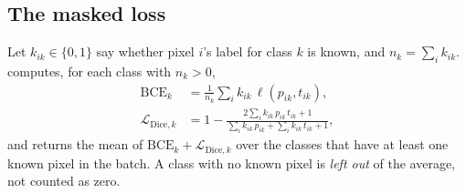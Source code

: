 \subsection{The masked loss}

Let $k_{ik} \in \{0, 1\}$ say whether pixel $i$'s label for class $k$ is known, and $n_k = \sum_i k_{ik}$.  computes, for
each class with $n_k > 0$,
\begin{align}
  \mathrm{BCE}_k &= \frac{1}{n_k}\sum_i k_{ik}\,\ell(p_{ik}, t_{ik}),\label{eq:seghead:mbce}\\
  \mathcal{L}_{\text{Dice},k} &= 1 - \frac{2\sum_i k_{ik}\,p_{ik}\,t_{ik} + 1}{\sum_i k_{ik}\,p_{ik} + \sum_i k_{ik}\,t_{ik} + 1},\label{eq:seghead:mdice}
\end{align}
and returns the mean of $\mathrm{BCE}_k + \mathcal{L}_{\text{Dice},k}$ over the classes that have at least one known pixel in the batch. A class
with no known pixel is \emph{left out} of the average, not counted as zero.


